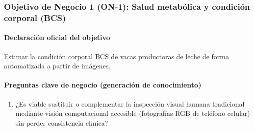 \subsubsection{Objetivo de Negocio 1 (ON-1): Salud metabólica y condición corporal (BCS)}

\paragraph{Declaración oficial del objetivo}
Estimar la condición corporal BCS de vacas productoras de leche de forma automatizada a partir de imágenes.

\paragraph{Preguntas clave de negocio (generación de conocimiento)}

\begin{enumerate}
  \item ¿Es viable sustituir o complementar la inspección visual humana tradicional mediante visión computacional accesible (fotografías RGB de teléfono celular) sin perder consistencia clínica?
\end{enumerate}
